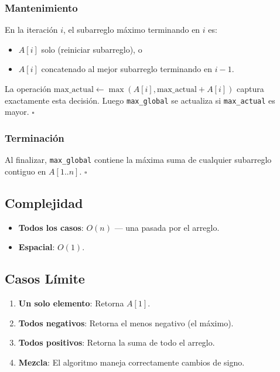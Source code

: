 \documentclass[11pt,a4paper]{article}
\begin{document}
\subsubsection{Mantenimiento}
En la iteración $i$, el subarreglo máximo terminando en $i$ es:
\begin{itemize}
    \item $A[i]$ solo (reiniciar subarreglo), o
    \item $A[i]$ concatenado al mejor subarreglo terminando en $i-1$.
\end{itemize}
La operación $\text{max\_actual} \gets \max(A[i], \text{max\_actual} + A[i])$ captura exactamente esta decisión. Luego \texttt{max\_global} se actualiza si \texttt{max\_actual} es mayor. $\square$

\subsubsection{Terminación}
Al finalizar, \texttt{max\_global} contiene la máxima suma de cualquier subarreglo contiguo en $A[1..n]$. $\square$

\subsection{Complejidad}
\begin{itemize}
    \item \textbf{Todos los casos}: $O(n)$ --- una pasada por el arreglo.
    \item \textbf{Espacial}: $O(1)$.
\end{itemize}

\subsection{Casos Límite}
\begin{enumerate}
    \item \textbf{Un solo elemento}: Retorna $A[1]$.
    \item \textbf{Todos negativos}: Retorna el menos negativo (el máximo).
    \item \textbf{Todos positivos}: Retorna la suma de todo el arreglo.
    \item \textbf{Mezcla}: El algoritmo maneja correctamente cambios de signo.
\end{enumerate}

\newpage

\end{document}
